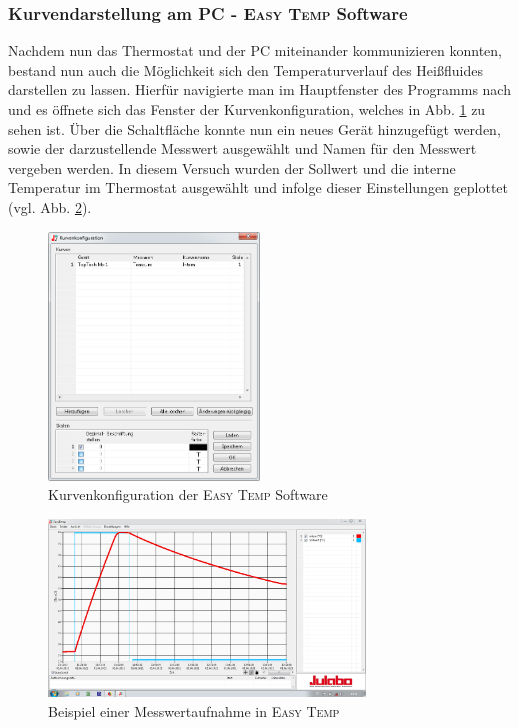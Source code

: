 \subsubsection*{Kurvendarstellung am PC - \textsc{Easy Temp} Software}
Nachdem nun das Thermostat und der PC miteinander kommunizieren konnten, bestand nun auch die Möglichkeit sich den Temperaturverlauf des Heißfluides darstellen zu lassen. Hierfür navigierte man im Hauptfenster des Programms nach  und es öffnete sich das Fenster der Kurvenkonfiguration, welches in Abb. \ref{fig:kurvenkonfig} zu sehen ist. Über die Schaltfläche  konnte nun ein neues Gerät hinzugefügt werden, sowie der darzustellende Messwert ausgewählt und Namen für den Messwert vergeben werden. In diesem Versuch wurden der Sollwert und die interne Temperatur im Thermostat ausgewählt und infolge dieser Einstellungen geplottet (vgl. Abb. \ref{fig:beispiel_plot}).

\begin{figure}[h!]
	\centering
	\includegraphics[width=0.5\textwidth]{img/julabo_3}
	\caption{Kurvenkonfiguration der \textsc{Easy Temp} Software}
	\label{fig:kurvenkonfig}
\end{figure}
\FloatBarrier

\begin{figure}[h!]
	\centering
	\includegraphics[width=0.75\textwidth]{img/julabo_4}
	\caption{Beispiel einer Messwertaufnahme in \textsc{Easy Temp}}
	\label{fig:beispiel_plot}
\end{figure}
\FloatBarrier

